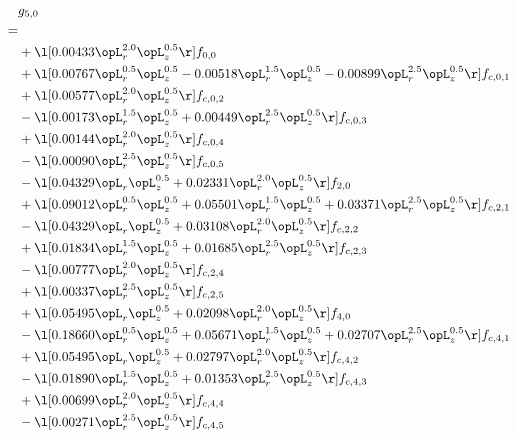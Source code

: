 \begin{alignat}{2} 
\label{eq:g_50_0} 
& g_{5,0} \nonumber \\ 
 = \\ 
& + \l[  0.00433 \opL_r^{2.0} \opL_z^{0.5}  \r] f_{0,0} \nonumber \\ 
& + \l[  0.00767 \opL_r^{0.5} \opL_z^{0.5}   -0.00518 \opL_r^{1.5} \opL_z^{0.5}   -0.00899 \opL_r^{2.5} \opL_z^{0.5}  \r] f_{c,0,1} \nonumber \\ 
& + \l[  0.00577 \opL_r^{2.0} \opL_z^{0.5}  \r] f_{c,0,2} \nonumber \\ 
& - \l[  0.00173 \opL_r^{1.5} \opL_z^{0.5} +  0.00449 \opL_r^{2.5} \opL_z^{0.5}  \r] f_{c,0,3} \nonumber \\ 
& + \l[  0.00144 \opL_r^{2.0} \opL_z^{0.5}  \r] f_{c,0,4} \nonumber \\ 
& - \l[  0.00090 \opL_r^{2.5} \opL_z^{0.5}  \r] f_{c,0,5} \nonumber \\ 
& - \l[  0.04329 \opL_r \opL_z^{0.5} +  0.02331 \opL_r^{2.0} \opL_z^{0.5}  \r] f_{2,0} \nonumber \\ 
& + \l[  0.09012 \opL_r^{0.5} \opL_z^{0.5} +  0.05501 \opL_r^{1.5} \opL_z^{0.5} +  0.03371 \opL_r^{2.5} \opL_z^{0.5}  \r] f_{c,2,1} \nonumber \\ 
& - \l[  0.04329 \opL_r \opL_z^{0.5} +  0.03108 \opL_r^{2.0} \opL_z^{0.5}  \r] f_{c,2,2} \nonumber \\ 
& + \l[  0.01834 \opL_r^{1.5} \opL_z^{0.5} +  0.01685 \opL_r^{2.5} \opL_z^{0.5}  \r] f_{c,2,3} \nonumber \\ 
& - \l[  0.00777 \opL_r^{2.0} \opL_z^{0.5}  \r] f_{c,2,4} \nonumber \\ 
& + \l[  0.00337 \opL_r^{2.5} \opL_z^{0.5}  \r] f_{c,2,5} \nonumber \\ 
& + \l[  0.05495 \opL_r \opL_z^{0.5} +  0.02098 \opL_r^{2.0} \opL_z^{0.5}  \r] f_{4,0} \nonumber \\ 
& - \l[  0.18660 \opL_r^{0.5} \opL_z^{0.5} +  0.05671 \opL_r^{1.5} \opL_z^{0.5} +  0.02707 \opL_r^{2.5} \opL_z^{0.5}  \r] f_{c,4,1} \nonumber \\ 
& + \l[  0.05495 \opL_r \opL_z^{0.5} +  0.02797 \opL_r^{2.0} \opL_z^{0.5}  \r] f_{c,4,2} \nonumber \\ 
& - \l[  0.01890 \opL_r^{1.5} \opL_z^{0.5} +  0.01353 \opL_r^{2.5} \opL_z^{0.5}  \r] f_{c,4,3} \nonumber \\ 
& + \l[  0.00699 \opL_r^{2.0} \opL_z^{0.5}  \r] f_{c,4,4} \nonumber \\ 
& - \l[  0.00271 \opL_r^{2.5} \opL_z^{0.5}  \r] f_{c,4,5} \nonumber \\ 

\end{alignat}
